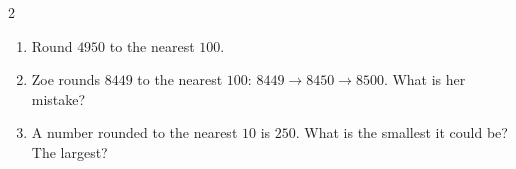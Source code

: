 \documentclass{beamer}
\newcommand{\ashow}[1]{\uncover<2->{\textcolor{red}{\small #1}}}
\begin{document}
\begin{frame}
\begin{columns}[T]
\begin{multicols}{2}
\begin{enumerate}
  \columnbreak

  \item Round $4950$ to the nearest $100$. \ashow{$5000$}

  \item Zoe rounds $8449$ to the nearest $100$: $8449\to 8450\to 8500$. What is her mistake? \ashow{Rounded twice: only the tens digit $4$ counts, so $8400$}

  \item A number rounded to the nearest $10$ is $250$. What is the smallest it could be? The largest? \ashow{$245$ and $254$}

\end{enumerate}
\end{multicols}

\end{columns}

\end{frame}
\end{document}
